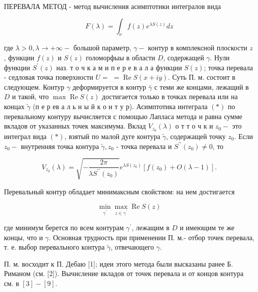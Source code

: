\documentclass[10pt]{article}
\begin{document}
ПЕРЕВАЛА МЕТОД - метод вычисления асимптотики интегралов вида



\[

F(\lambda)=\int_{\nu} f(z) e^{\lambda S(z)} d z

\]



где $\lambda>0, \lambda \rightarrow+\infty-$ большой параметр, $\gamma-$ контур в комплексной плоскости $z$, функции $f(z)$ и $S(z)$ голоморфыы в области $D$, содержащей $\gamma$. Нули функции $S^{\prime}(z)$ наз. т о ч к а м и п е р е в а л а функции $S(z)$; точка перевала - седловая точка поверхности $U=$ $=\operatorname{Re} S(x+i y)$. Суть П. м. состоит в следующем. Контур $\gamma$ деформируется в контур $\bar{\gamma}$ с теми же концами, лежащий в $D$ и такой, что $\max \operatorname{Re} S(z)$ достигается только в точках перевала или на концах $\tilde{\gamma}$ (п е р ев а л ь н ы й к о н т у р). Асимптотика интеграла $(*)$ по перевальному контуру вычисляется с помощью Лапласа метода и равна сумме вкладов от указанных точек максимума. Вклад $V_{z_{0}}(\lambda)$ о т т о ч к и $z_{0}-$ это интеграл вида $(*)$, взятый по малой дуге контура $\tilde{\gamma}$, содержащей точку $z_{0}$. Если $z_{0}-$ внутренняя точка контура $\tilde{\gamma}, z_{0}$ - точка перевала и $S^{\prime \prime}\left(z_{0}\right) \neq 0$, то



\[

V_{z_{0}}(\lambda)=\sqrt{-\frac{2 \pi}{\lambda S^{\prime \prime}\left(z_{0}\right)}} e^{\lambda S\left(z_{0}\right)}\left[f\left(z_{0}\right)+O(\lambda-1)\right] .

\]



Перевальный контур обладает минимаксным свойством: на нем достигается



\[

\min _{\gamma^{\prime}} \max _{z \in \gamma^{\prime}} \operatorname{Re} S(z)

\]



где минимум берется по всем контурам $\gamma^{\prime}$, лежащим в $D$ и имеющим те же концы, что и $\gamma$. Основная трудность при применении П. м.- отбор точек перевала, т. е. выбор перевального контура $\tilde{\gamma}$, отвечающего $\gamma$.



П. м. восходит к П. Дебаю [1]; идеи этого метода были высказаны ранее Б. Риманом (см. [2]). Вычисление вкладов от точек перевала и от концов контура см. в $[3]-[9]$.
\end{document}
